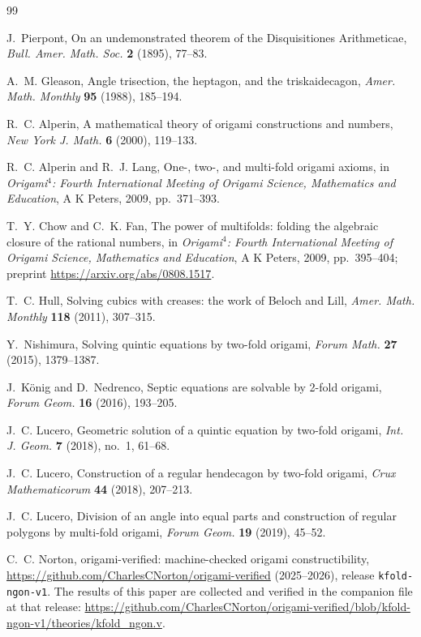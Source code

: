 \documentclass[11pt]{amsart}
\theoremstyle{plain}
\theoremstyle{definition}
\begin{document}
\begin{thebibliography}{99}
\raggedright

 J.~Pierpont, On an undemonstrated theorem of the Disquisitiones Arithmeticae, \emph{Bull. Amer. Math. Soc.} \textbf{2} (1895), 77--83.

 A.~M. Gleason, Angle trisection, the heptagon, and the triskaidecagon, \emph{Amer. Math. Monthly} \textbf{95} (1988), 185--194.

 R.~C. Alperin, A mathematical theory of origami constructions and numbers, \emph{New York J. Math.} \textbf{6} (2000), 119--133.

 R.~C. Alperin and R.~J. Lang, One-, two-, and multi-fold origami axioms, in \emph{Origami$^4$: Fourth International Meeting of Origami Science, Mathematics and Education}, A K Peters, 2009, pp.~371--393.

 T.~Y. Chow and C.~K. Fan, The power of multifolds: folding the algebraic closure of the rational numbers, in \emph{Origami$^4$: Fourth International Meeting of Origami Science, Mathematics and Education}, A K Peters, 2009, pp.~395--404; preprint \url{https://arxiv.org/abs/0808.1517}.

 T.~C. Hull, Solving cubics with creases: the work of Beloch and Lill, \emph{Amer. Math. Monthly} \textbf{118} (2011), 307--315.

 Y.~Nishimura, Solving quintic equations by two-fold origami, \emph{Forum Math.} \textbf{27} (2015), 1379--1387.

 J.~K\"onig and D.~Nedrenco, Septic equations are solvable by 2-fold origami, \emph{Forum Geom.} \textbf{16} (2016), 193--205.

 J.~C. Lucero, Geometric solution of a quintic equation by two-fold origami, \emph{Int. J. Geom.} \textbf{7} (2018), no.~1, 61--68.

 J.~C. Lucero, Construction of a regular hendecagon by two-fold origami, \emph{Crux Mathematicorum} \textbf{44} (2018), 207--213.

 J.~C. Lucero, Division of an angle into equal parts and construction of regular polygons by multi-fold origami, \emph{Forum Geom.} \textbf{19} (2019), 45--52.

 C.~C. Norton, origami-verified: machine-checked origami constructibility, \url{https://github.com/CharlesCNorton/origami-verified} (2025--2026), release \texttt{kfold-ngon-v1}. The results of this paper are collected and verified in the companion file at that release: \url{https://github.com/CharlesCNorton/origami-verified/blob/kfold-ngon-v1/theories/kfold_ngon.v}.

\end{thebibliography}
\end{document}
